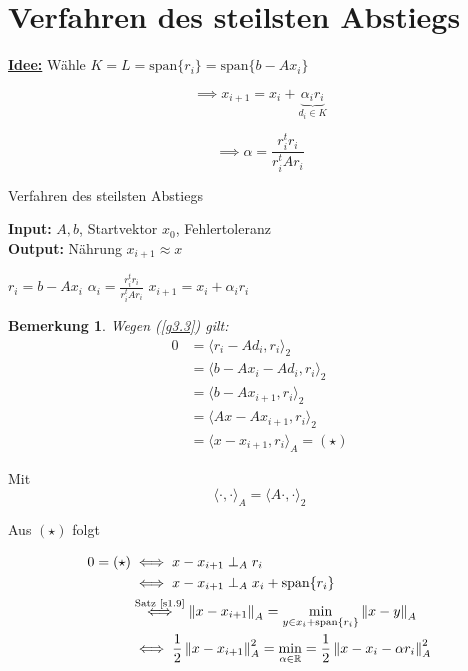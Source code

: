 \documentclass{book}
\newtheorem{remark}[algorithm]{Bemerkung}
\def\R{\mathbb{R}}
\begin{document}
        \section{Verfahren des steilsten Abstiegs}

            \underline{\textbf{Idee:}} Wähle $K=L=\text{span}\{r_i\}=\text{span}\{b-Ax_i\}$

            \[\implies x_{i+1}=x_i+\underbrace{\alpha_i r_i}_{d_i\in K}\]

            \[\implies \alpha = \frac{r_i^tr_i}{r_i^tAr_i}\]
            
            \begin{algorithm}[H]\label{a3.5}
                \caption{Verfahren des steilsten Abstiegs}
                \textbf{Input:} $A,b$, Startvektor $x_0$, Fehlertoleranz\\
                \textbf{Output:} Nährung $x_{i+1}\approx x$
                \begin{algorithmic}
                 
                    \State $r_i=b-Ax_i$
                    \State $\alpha_i= \frac{r_i^tr_i}{r_i^tAr_i}$
                    \State $x_{i+1}=x_i+\alpha_i r_i$
                \EndWhile
                \end{algorithmic}
            \end{algorithm}

            \begin{remark}\label{b3.6}
                Wegen (\ref{g3.3}) gilt:
                \begin{align*}
                    0&=\langle r_i-Ad_i,r_i \rangle_2\\
                    &=\langle b-Ax_i-Ad_i,r_i \rangle_2\\
                    &=\langle b-Ax_{i+1},r_i \rangle_2\\
                    &= \langle Ax-Ax_{i+1}, r_i\rangle_2\\
                    &= \langle x-x_{i+1}, r_i\rangle_A = (\star)
                \end{align*}
            \end{remark}

            Mit 
            \[
                \langle \cdot,\cdot \rangle_A=\langle A\cdot,\cdot \rangle_2
            \]

            Aus $(\star)$ folgt 

            \begin{align*}
                0=(\star) &\iff x-x_{i+1} \perp_A r_i \\
                &\iff x-x_{i+1} \perp_A x_i+\text{span}\{r_i\}\\
                &\stackrel{\text{Satz \ref*{s1.9}}}{\iff} \left\Vert x-x_{i+1} \right\Vert_A=\min_{y\in x_i+\text{span}\{r_i\}} \left\Vert x-y \right\Vert_A\\
                &\iff \frac{1}{2} \left\Vert x-x_{i+1}  \right\Vert_A^2 = \min_{\alpha\in \R}=\frac{1}{2} \left\Vert  x-x_i-\alpha r_i \right\Vert_A^2
            \end{align*}
\end{document}
